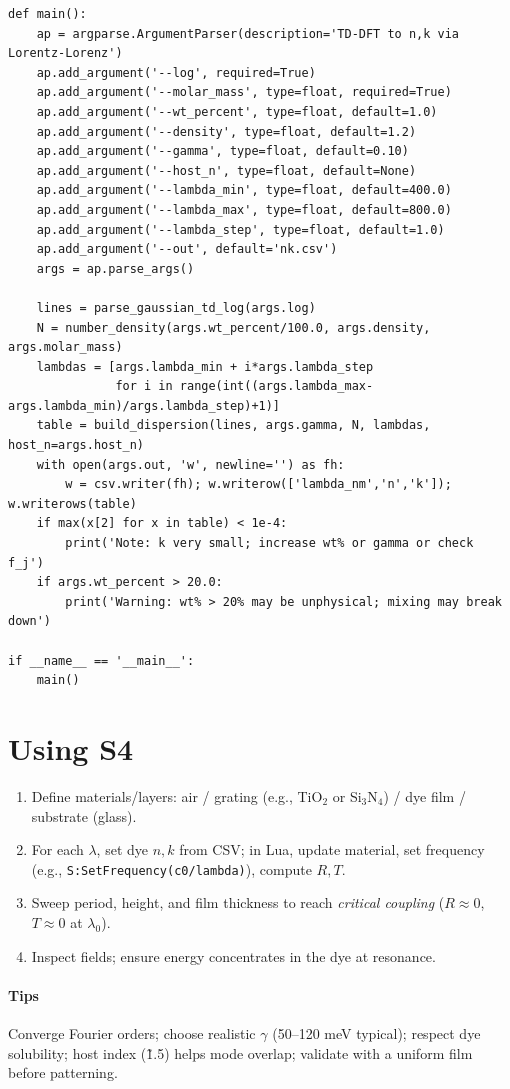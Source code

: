 \documentclass[11pt,a4paper]{article}
\begin{document}
\begin{verbatim}
def main():
    ap = argparse.ArgumentParser(description='TD-DFT to n,k via Lorentz-Lorenz')
    ap.add_argument('--log', required=True)
    ap.add_argument('--molar_mass', type=float, required=True)
    ap.add_argument('--wt_percent', type=float, default=1.0)
    ap.add_argument('--density', type=float, default=1.2)
    ap.add_argument('--gamma', type=float, default=0.10)
    ap.add_argument('--host_n', type=float, default=None)
    ap.add_argument('--lambda_min', type=float, default=400.0)
    ap.add_argument('--lambda_max', type=float, default=800.0)
    ap.add_argument('--lambda_step', type=float, default=1.0)
    ap.add_argument('--out', default='nk.csv')
    args = ap.parse_args()

    lines = parse_gaussian_td_log(args.log)
    N = number_density(args.wt_percent/100.0, args.density, args.molar_mass)
    lambdas = [args.lambda_min + i*args.lambda_step
               for i in range(int((args.lambda_max-args.lambda_min)/args.lambda_step)+1)]
    table = build_dispersion(lines, args.gamma, N, lambdas, host_n=args.host_n)
    with open(args.out, 'w', newline='') as fh:
        w = csv.writer(fh); w.writerow(['lambda_nm','n','k']); w.writerows(table)
    if max(x[2] for x in table) < 1e-4:
        print('Note: k very small; increase wt% or gamma or check f_j')
    if args.wt_percent > 20.0:
        print('Warning: wt% > 20% may be unphysical; mixing may break down')

if __name__ == '__main__':
    main()
\end{verbatim}

\section{Using S4}
\begin{enumerate}
  \item Define materials/layers: air / grating (e.g., TiO$_2$ or Si$_3$N$_4$) / dye film / substrate (glass).
  \item For each $\lambda$, set dye $n,k$ from CSV; in Lua, update material, set frequency (e.g., \texttt{S:SetFrequency(c0/lambda)}), compute $R,T$.
  \item Sweep period, height, and film thickness to reach \emph{critical coupling} ($R\approx 0$, $T\approx 0$ at $\lambda_0$).
  \item Inspect fields; ensure energy concentrates in the dye at resonance.
\end{enumerate}

\paragraph{Tips} Converge Fourier orders; choose realistic $\gamma$ (50--120 meV typical); respect dye solubility; host index (\~1.5) helps mode overlap; validate with a uniform film before patterning.
\end{document}

